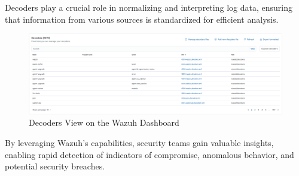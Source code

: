 Decoders play a crucial role in normalizing and interpreting log data, ensuring that information from various sources is standardized for efficient analysis.

\begin{figure}[H]
    \centering
    \includegraphics[width=\textwidth]{images/threat-hunting/decoders.png}
    \caption{Decoders View on the Wazuh Dashboard}
    \label{fig:default-decoder-details}
\end{figure}

By leveraging Wazuh's capabilities, security teams gain valuable insights, enabling rapid detection of indicators of compromise, anomalous behavior, and potential security breaches.
